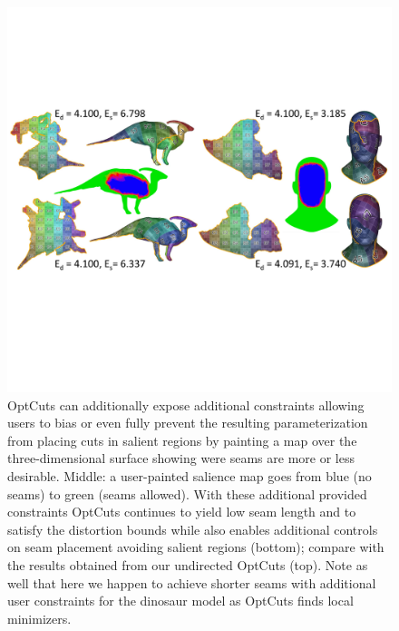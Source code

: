 %


\begin{figure}[t]
\centering
\includegraphics[width=\linewidth]{fig/regional_user.pdf}
\vspace{-0.3cm}
\caption{OptCuts can additionally expose additional constraints allowing 
users to bias or even fully prevent the resulting parameterization from placing cuts in salient regions by painting a map over the three-dimensional surface showing were seams are more or less desirable. 
Middle: a user-painted salience map goes from blue (no seams) to green (seams allowed). With these additional provided constraints OptCuts continues to yield low seam length and to satisfy the distortion bounds while also enables additional controls on seam placement avoiding salient regions (bottom); compare with the results obtained from our undirected OptCuts (top). Note as well that here we happen to achieve shorter seams with additional user constraints for the dinosaur model as OptCuts finds local minimizers.}
\vspace{-0.3cm}
\label{fig:regional_seam_placement}
\end{figure}

